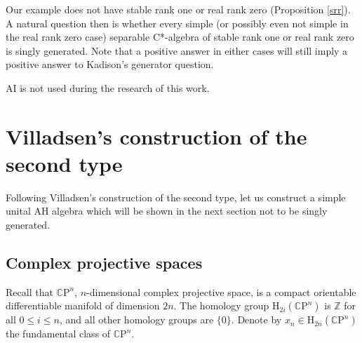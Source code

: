 \documentclass[12pt, oneside, psamsfonts]{amsart}
\theoremstyle{definition}
\theoremstyle{remark}
\numberwithin{equation}{section}
\newcommand{\Int}{\mathbb Z}
\newcommand{\Comp}{\mathbb C}
\begin{document}
Our example does not have stable rank one or real rank zero (Proposition \ref{srr}). A natural question then is whether every simple (or possibly even not simple in the real rank zero case) separable C*-algebra of stable rank one or real rank zero is singly generated. Note that a positive answer in either cases will still imply a positive answer to Kadison's generator question.


AI is not used during the research of this work. 

\section{Villadsen's construction of the second type}\label{construction}



Following Villadsen's construction of the second type, let us construct a simple unital AH algebra which will be shown in the next section not to be singly generated. 

\subsection{Complex projective spaces} Recall that $\Comp\mathrm{P}^n$, $n$-dimensional complex projective space, is a compact orientable differentiable manifold of dimension $2n$.  The homology group $\mathrm H_{2i}(\Comp\mathrm{P}^n)$ is $\Int$ for all $0\leq i \leq n$, and all other homology groups are $\{0\}$. Denote by $x_n \in \mathrm H_{2n}(\Comp\mathrm{P}^n)$ the fundamental class of $\Comp\mathrm{P}^n$.  %

\end{document}
